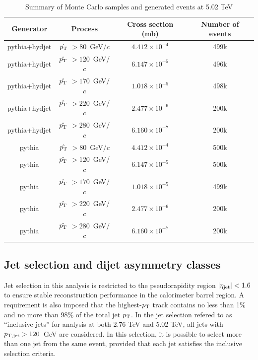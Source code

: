 \begin{table}[h!]
\begin{center} 
\caption{Summary of Monte Carlo samples and generated events at 5.02 TeV}

\label{mc_stats_502} \begin{tabular}{|c|c|c|c|}
\hline
\hline

Generator & Process & Cross section (mb) & Number of events \\
\hline
{\sc pythia+hydjet} & $\hat{p_{\rm T}}$ $> 80$~GeV/$c$ & $4.412\times 10^{-4}$ & 499k \\
{\sc pythia+hydjet} & $\hat{p_{\rm T}}$ $> 120$~GeV/$c$ & $ 6.147\times 10^{-5}$& 496k \\
{\sc pythia+hydjet} & $\hat{p_{\rm T}}$ $> 170$~GeV/$c$ &  $1.018\times 10^{-5}$ & 498k \\
{\sc pythia+hydjet} & $\hat{p_{\rm T}}$ $> 220$~GeV/$c$ &  $2.477\times 10^{-6}$ & 200k \\
{\sc pythia+hydjet} & $\hat{p_{\rm T}}$ $> 280$~GeV/$c$ &  $6.160\times 10^{-7}$ & 200k \\




\hline
{\sc pythia} & $\hat{p_{\rm T}}$ $> 80$~GeV/$c$ & $4.412\times 10^{-4}$ & 500k \\
{\sc pythia} & $\hat{p_{\rm T}}$ $> 120$~GeV/$c$ & $6.147\times 10^{-5}$& 500k \\
{\sc pythia} & $\hat{p_{\rm T}}$ $> 170$~GeV/$c$ & $1.018\times 10^{-5}$ & 499k \\
{\sc pythia} & $\hat{p_{\rm T}}$ $> 220$~GeV/$c$ & $2.477\times 10^{-6}$ & 200k \\
{\sc pythia} & $\hat{p_{\rm T}}$ $> 280$~GeV/$c$ & $6.160\times 10^{-7}$ & 200k \\


\hline
\hline

\end{tabular}
\end{center} 
\end{table} 


\clearpage


\subsection{Jet selection and dijet asymmetry classes}
\label{sec:jet_sel}

Jet selection in this analysis is restricted to the pseudorapidity region $|\eta_{\rm jet}| < 1.6$ to ensure stable reconstruction performance in the calorimeter barrel region.  A requirement is also imposed that the highest-$p_{\rm T}$ track contains no less than 1\% and no more than 98\% of the total jet $p_{\rm T}$.  In the jet selection refered to as ``inclusive jets'' for analysis at both 2.76 TeV and 5.02 TeV, all jets with $p_{\rm T, jet} > 120$~GeV are considered.  In this selection, it is possible to select more than one jet from the same event, provided that each jet satisfies the inclusive selection criteria. 

